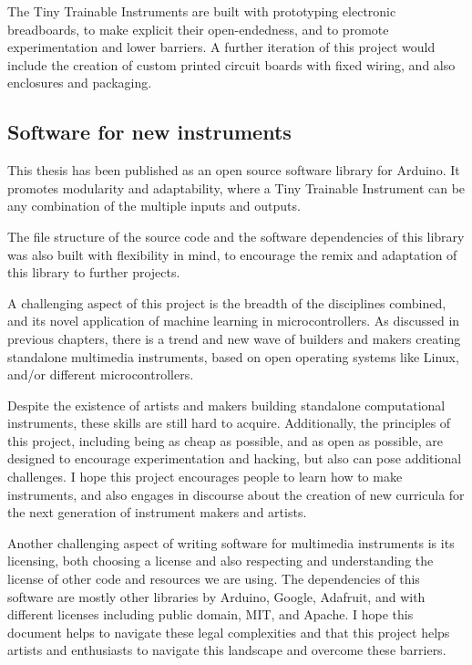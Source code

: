 The Tiny Trainable Instruments are built with prototyping electronic breadboards, to make explicit their open-endedness, and to promote experimentation and lower barriers. A further iteration of this project would include the creation of custom printed circuit boards with fixed wiring, and also enclosures and packaging.

\subsection{Software for new instruments}

This thesis has been published as an open source software library for Arduino. It promotes modularity and adaptability, where a Tiny Trainable Instrument can be any combination of the multiple inputs and outputs.

The file structure of the source code and the software dependencies of this library was also built with flexibility in mind, to encourage the remix and adaptation of this library to further projects.

A challenging aspect of this project is the breadth of the disciplines combined, and its novel application of machine learning in microcontrollers. As discussed in previous chapters, there is a trend and new wave of builders and makers creating standalone multimedia instruments, based on open operating systems like Linux, and/or different microcontrollers. 

Despite the existence of artists and makers building standalone computational instruments, these skills are still hard to acquire. Additionally, the principles of this project, including being as cheap as possible, and as open as possible, are designed to encourage experimentation and hacking, but also can pose additional challenges. I hope this project encourages people to learn how to make instruments, and also engages in discourse about the creation of new curricula for the next generation of instrument makers and artists.

Another challenging aspect of writing software for multimedia instruments is its licensing, both choosing a license and also respecting and understanding the license of other code and resources we are using. The dependencies of this software are mostly other libraries by Arduino, Google, Adafruit, and with different licenses including public domain, MIT, and Apache. I hope this document helps to navigate these legal complexities and that this project helps artists and enthusiasts to navigate this landscape and overcome these barriers.


